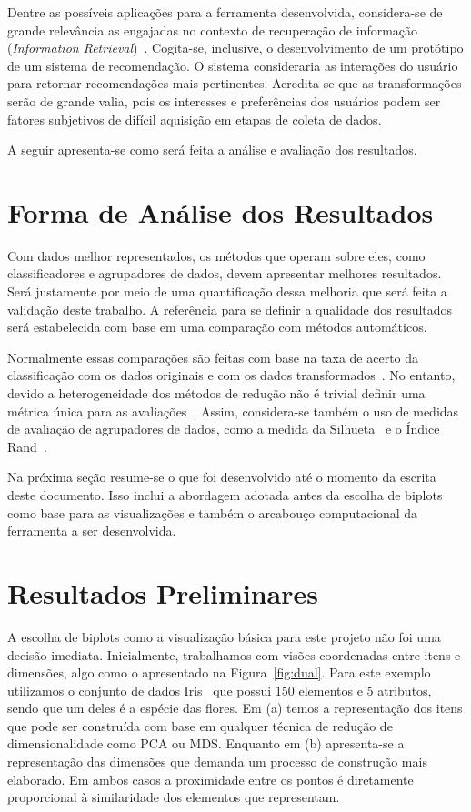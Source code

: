 Dentre as possíveis aplicações para a ferramenta
desenvolvida, considera-se de grande relevância as
engajadas no contexto de recuperação de informação
(\emph{Information Retrieval})~\cite{Manning2008}.
Cogita-se, inclusive, o desenvolvimento de um protótipo de um
sistema de recomendação. O sistema consideraria
as interações do usuário para retornar recomendações mais
pertinentes. Acredita-se que as transformações serão de
grande valia, pois os interesses e preferências dos usuários
podem ser fatores subjetivos de difícil aquisição em etapas
de coleta de dados.

A seguir apresenta-se como será feita a análise e avaliação
dos resultados.

\section{Forma de Análise dos Resultados}

Com dados melhor representados, os métodos que operam sobre
eles, como classificadores e agrupadores de dados, devem
apresentar melhores resultados. Será justamente por meio de
uma quantificação dessa melhoria que será feita a validação
deste trabalho. A referência para se definir a qualidade dos
resultados será estabelecida com base em uma comparação com
métodos automáticos. 

Normalmente essas comparações são
feitas com base na taxa de acerto da classificação com os
dados originais e com os dados
transformados~\cite{Guyon2003,Joshi2007}. No entanto, devido
a heterogeneidade dos métodos de redução não é trivial
definir uma métrica única para as
avaliações~\cite{Medeiros2011}. Assim, considera-se também o
uso de medidas de avaliação de agrupadores de dados, como a
medida da Silhueta~\cite{Rousseeuw1987} e o Índice
Rand~\cite{Rand1971}.

Na próxima seção resume-se o que foi desenvolvido
até o momento da escrita deste documento. Isso inclui a
abordagem adotada antes da escolha de biplots como base para
as visualizações e também o arcabouço computacional da
ferramenta a ser desenvolvida.

\section{Resultados Preliminares}

A escolha de biplots como a visualização básica para este
projeto não foi uma decisão imediata. Inicialmente,
trabalhamos com visões coordenadas entre itens e
dimensões, algo como o apresentado na Figura~\ref{fig:dual}.
Para este exemplo utilizamos o conjunto de dados
Iris~\cite{Fisher1936} que possui 150 elementos e 5
atributos, sendo que um deles é a espécie das flores. Em
(a) temos a representação dos itens que pode ser construída
com base em qualquer técnica de redução de dimensionalidade
como PCA ou MDS. Enquanto em (b) apresenta-se a representação das
dimensões que demanda um processo de construção mais
elaborado. Em ambos casos a proximidade entre os
pontos é diretamente proporcional à similaridade dos
elementos que representam.

